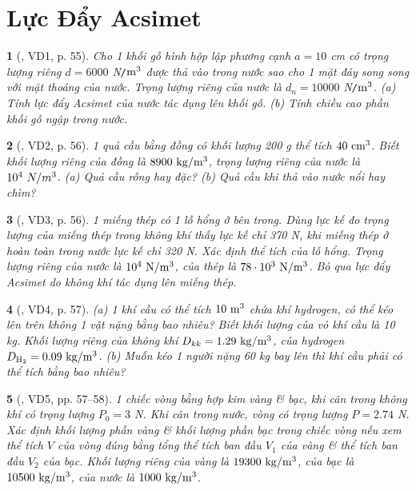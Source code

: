 \documentclass{article}
\newtheorem{baitoan}{}
\begin{document}

\section{Lực Đẩy Acsimet}


\begin{baitoan}[\cite{Van_Quyen_Hanh_Nhu_10_chuyen_Ly}, VD1, p. 55]
	Cho 1 khối gỗ hình hộp lập phương cạnh $a = 10$ {\rm cm} có trọng lượng riêng $d = 6000$ {\rm N{\tt/}$\rm m^3$} được thả vào trong nước sao cho 1 mặt đáy song song với mặt thoáng của nước. Trọng lượng riêng của nước là $d_n = 10000$ {\rm N{\tt/}$\rm m^3$}. (a) Tính lực đẩy Acsimet của nước tác dụng lên khối gỗ. (b) Tính chiều cao phần khối gỗ ngập trong nước.
\end{baitoan}

\begin{baitoan}[\cite{Van_Quyen_Hanh_Nhu_10_chuyen_Ly}, VD2, p. 56]
	1 quả cầu bằng đồng có khối lượng {\rm200 g} thể tích $\rm40\ cm^3$. Biết khối lượng riêng của đồng là $\rm8900\ kg{\tt/}m^3$, trọng lượng riêng của nước là $10^4\ N{\tt/}m^3$. (a) Quả cầu rỗng hay đặc? (b) Quả cầu khi thả vào nước nổi hay chìm?
\end{baitoan}

\begin{baitoan}[\cite{Van_Quyen_Hanh_Nhu_10_chuyen_Ly}, VD3, p. 56]
	1 miếng thép có 1 lỗ hổng ở bên trong. Dùng lực kế đo trọng lượng của miếng thép trong không khí thấy lực kế chỉ {\rm370 N}, khi miếng thép ở hoàn toàn trong nước lực kế chỉ {\rm320 N}. Xác định thể tích của lỗ hổng. Trọng lượng riêng của nước là $\rm10^4\ N{\tt/}m^3$, của thép là $\rm78\cdot 10^3\ N{\tt/}m^3$. Bỏ qua lực đẩy Acsimet do không khí tác dụng lên miếng thép.
\end{baitoan}

\begin{baitoan}[\cite{Van_Quyen_Hanh_Nhu_10_chuyen_Ly}, VD4, p. 57]
	(a) 1 khí cầu có thể tích $\rm10\ m^3$ chứa khí hydrogen, có thể kéo lên trên không 1 vật nặng bằng bao nhiêu? Biết khối lượng của vỏ khí cầu là {\rm10 kg}. Khối lượng riêng của không khí $D_{kk} = 1.29\ {\rm kg{\tt/}m^3}$, của hydrogen $D_{\rm H_2} = 0.09\ {\rm kg{\tt/}m^3}$. (b) Muốn kéo 1 người nặng {\rm60 kg} bay lên thì khí cầu phải có thể tích bằng bao nhiêu?
\end{baitoan}

\begin{baitoan}[\cite{Van_Quyen_Hanh_Nhu_10_chuyen_Ly}, VD5, pp. 57--58]
	1 chiếc vòng bằng hợp kim vàng \& bạc, khi cân trong không khí có trọng lượng $P_0 = 3$ {\rm N}. Khi cân trong nước, vòng có trọng lượng $P = 2.74$ {\rm N}. Xác định khối lượng phần vàng \& khối lượng phần bạc trong chiếc vòng nếu xem thể tích $V$ của vòng đúng bằng tổng thể tích ban đầu $V_1$ của vàng \& thể tích ban đầu $V_2$ của bạc. Khối lượng riêng của vàng là $\rm19300\ kg{\tt/}m^3$, của bạc là $\rm10500\ kg{\tt/}m^3$, của nước là $\rm1000\ kg{\tt/}m^3$.
\end{baitoan}
\end{document}
